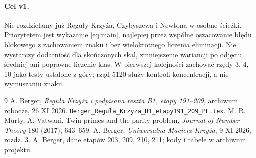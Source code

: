 \documentclass[11pt,a4paper]{article}
\begin{document}
\paragraph{Cel v1.} Nie rozdzielamy już Reguły Krzyża, Czybyszewa i Newtona w osobne ścieżki. Priorytetem jest wykazanie \eqref{eq:main}, najlepiej przez wspólne oszacowanie błędu blokowego z zachowaniem znaku i bez wielokrotnego liczenia eliminacji. Nie wystarczy dodatniość dla skończonych skal, zmniejszenie wariancji po odjęciu średniej ani poprawne liczenie klas. W pierwszej kolejności zachować rzędy 3, 4, 10 jako testy ustalone z góry; rząd 5120 służy kontroli koncentracji, a nie wymuszaniu znaku.
\begin{thebibliography}{9}
 A. Berger, \emph{Reguła Krzyża i podpisana reszta B1, etapy 191--209}, archiwum robocze, 26 XI 2026. \texttt{Berger\_Regula\_Krzyza\_B1\_etapy191\_209\_PL.tex}.
 M. R. Murty, A. Vatwani, Twin primes and the parity problem, \emph{Journal of Number Theory} 180 (2017), 643--659.
 A. Berger, \emph{Uniwersalna Macierz Krzyża}, 9 XI 2026, rozdz. 3.
 A. Berger, dane etapów 203, 209, 210, 211; kody i tabele w archiwum projektu.
\end{thebibliography}
\end{document}

